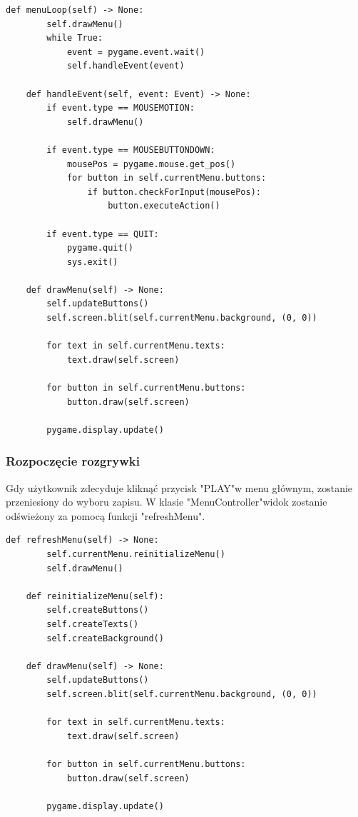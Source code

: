 \documentclass{article}
\begin{document}
\begin{center}
    \begin{lstlisting}[language=pythonSchema]
    def menuLoop(self) -> None:
        self.drawMenu()
        while True:
            event = pygame.event.wait()
            self.handleEvent(event)

    def handleEvent(self, event: Event) -> None:
        if event.type == MOUSEMOTION:
            self.drawMenu()
            
        if event.type == MOUSEBUTTONDOWN:
            mousePos = pygame.mouse.get_pos()
            for button in self.currentMenu.buttons:
                if button.checkForInput(mousePos):
                    button.executeAction()

        if event.type == QUIT:
            pygame.quit()
            sys.exit()
            
    def drawMenu(self) -> None:
        self.updateButtons()
        self.screen.blit(self.currentMenu.background, (0, 0))

        for text in self.currentMenu.texts:
            text.draw(self.screen)

        for button in self.currentMenu.buttons:
            button.draw(self.screen)

        pygame.display.update()
    \end{lstlisting}
\end{center}
\newpage
\subsubsection{Rozpoczęcie rozgrywki}
Gdy użytkownik zdecyduje kliknąć przycisk "PLAY"\space w menu głównym, zostanie przeniesiony do wyboru zapisu. W klasie "MenuController"\space widok zostanie odświeżony za pomocą funkcji "refreshMenu".

\begin{center}
    \begin{lstlisting}[language=pythonSchema]
    def refreshMenu(self) -> None:
        self.currentMenu.reinitializeMenu()
        self.drawMenu()

    def reinitializeMenu(self):
        self.createButtons()
        self.createTexts()
        self.createBackground()

    def drawMenu(self) -> None:
        self.updateButtons()
        self.screen.blit(self.currentMenu.background, (0, 0))

        for text in self.currentMenu.texts:
            text.draw(self.screen)

        for button in self.currentMenu.buttons:
            button.draw(self.screen)

        pygame.display.update()
    \end{lstlisting}
\end{center}
\end{document}
